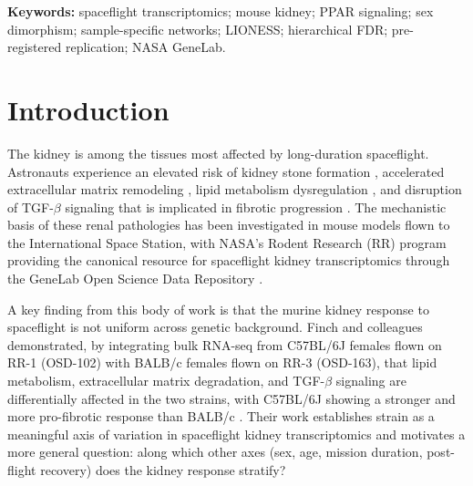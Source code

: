 \documentclass[11pt]{article}
\begin{document}
\begin{abstract}
\end{abstract}

\vspace{0.3em}
\noindent\textbf{Keywords:} spaceflight transcriptomics; mouse kidney; PPAR signaling; sex dimorphism; sample-specific networks; LIONESS; hierarchical FDR; pre-registered replication; NASA GeneLab.

\tableofcontents
\clearpage

\section{Introduction}

The kidney is among the tissues most affected by long-duration spaceflight. Astronauts experience an elevated risk of kidney stone formation \citep{cockett1962astronautical, smith2014men}, accelerated extracellular matrix remodeling \citep{siew2024cosmic}, lipid metabolism dysregulation \citep{beheshti2018microrna}, and disruption of TGF-$\beta$ signaling that is implicated in fibrotic progression \citep{wynn2012mechanisms}. The mechanistic basis of these renal pathologies has been investigated in mouse models flown to the International Space Station, with NASA's Rodent Research (RR) program providing the canonical resource for spaceflight kidney transcriptomics through the GeneLab Open Science Data Repository \citep{ray2019genelab}.

A key finding from this body of work is that the murine kidney response to spaceflight is not uniform across genetic background. Finch and colleagues demonstrated, by integrating bulk RNA-seq from C57BL/6J females flown on RR-1 (OSD-102) with BALB/c females flown on RR-3 (OSD-163), that lipid metabolism, extracellular matrix degradation, and TGF-$\beta$ signaling are differentially affected in the two strains, with C57BL/6J showing a stronger and more pro-fibrotic response than BALB/c \citep{finch2025strain}. Their work establishes strain as a meaningful axis of variation in spaceflight kidney transcriptomics and motivates a more general question: along which other axes (sex, age, mission duration, post-flight recovery) does the kidney response stratify?
\end{document}
